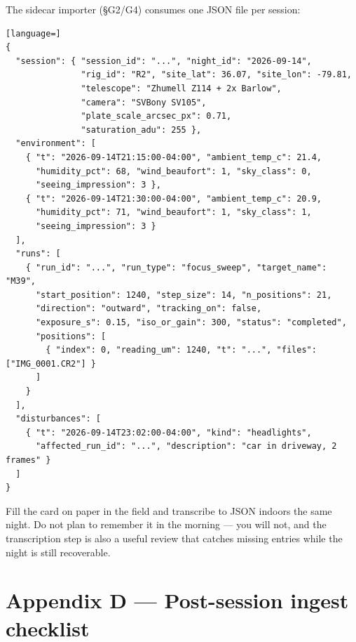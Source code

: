 \documentclass[11pt]{article}
\begin{document}
The sidecar importer (\S G2/G4) consumes one JSON file per session:

\begin{lstlisting}[language=]
{
  "session": { "session_id": "...", "night_id": "2026-09-14",
               "rig_id": "R2", "site_lat": 36.07, "site_lon": -79.81,
               "telescope": "Zhumell Z114 + 2x Barlow",
               "camera": "SVBony SV105",
               "plate_scale_arcsec_px": 0.71,
               "saturation_adu": 255 },
  "environment": [
    { "t": "2026-09-14T21:15:00-04:00", "ambient_temp_c": 21.4,
      "humidity_pct": 68, "wind_beaufort": 1, "sky_class": 0,
      "seeing_impression": 3 },
    { "t": "2026-09-14T21:30:00-04:00", "ambient_temp_c": 20.9,
      "humidity_pct": 71, "wind_beaufort": 1, "sky_class": 1,
      "seeing_impression": 3 }
  ],
  "runs": [
    { "run_id": "...", "run_type": "focus_sweep", "target_name": "M39",
      "start_position": 1240, "step_size": 14, "n_positions": 21,
      "direction": "outward", "tracking_on": false,
      "exposure_s": 0.15, "iso_or_gain": 300, "status": "completed",
      "positions": [
        { "index": 0, "reading_um": 1240, "t": "...", "files": ["IMG_0001.CR2"] }
      ]
    }
  ],
  "disturbances": [
    { "t": "2026-09-14T23:02:00-04:00", "kind": "headlights",
      "affected_run_id": "...", "description": "car in driveway, 2 frames" }
  ]
}
\end{lstlisting}

\begin{keybox}
Fill the card on paper in the field and transcribe to JSON indoors the same
night. Do not plan to remember it in the morning --- you will not, and the
transcription step is also a useful review that catches missing entries while
the night is still recoverable.
\end{keybox}

\section*{Appendix D --- Post-session ingest checklist}
\end{document}
